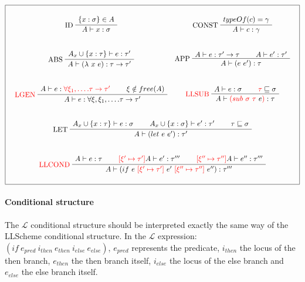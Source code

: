\documentclass[a4paper]{report}
\newcommand{\lang}[0]{\mathcal{L}}
\newcommand{\ax}[1]%
{\AxiomC{$#1$}}
\newcommand{\unc}[1]%
{\UnaryInfC{$#1$}}
\newcommand{\bic}[1]%
{\BinaryInfC{$#1$}}
\newcommand{\tric}[1]%
{\TrinaryInfC{$#1$}}
\newcommand{\drule}%
{\DisplayProof}
\begin{document}
\begin{table}
\centering
$$\boxed{\begin{array}{c}\begin{array}{cc}
\\
\ax{\{x:\sigma\}\in A}
\LeftLabel{ID}
\unc{A\vdash x:\sigma}
\drule
&
\ax{typeOf(c)=\gamma}
\LeftLabel{CONST}
\unc{A\vdash c:\gamma}
\drule
\\\\\\
\ax{A_x\cup\{x:\tau\}\vdash e:\tau'}
\LeftLabel{ABS}
\unc{A\vdash(\lambda\ x\ e):\tau\to\tau'}
\drule
&
\ax{A\vdash e:\tau'\to\tau}
\ax{A\vdash e':\tau'}
\LeftLabel{APP}
\bic{A\vdash (e\ e'):\tau}
\drule
\\\\\\
\ax{A\vdash e:\textcolor{red}{\forall \xi_1,\ldots.\tau\to\tau'}}
\ax{\xi\notin free(A)}
\LeftLabel{\textcolor{red}{LGEN}}
\bic{A\vdash e:\forall\xi,\xi_1,\ldots.\tau\to\tau'}
\drule
&
\ax{A\vdash e:\sigma}
\ax{\textcolor{red}{\tau}\sqsubseteq\sigma}
\LeftLabel{\textcolor{red}{LLSUB}}
\bic{A\vdash \textcolor{red}{(sub\ \sigma\ \tau}\ e\textcolor{red}{)}:\tau}
\drule
\end{array}
\\\\\\
\ax{A_x\cup\{x:\tau\}\vdash e:\sigma}
\ax{A_x\cup\{x:\sigma\}\vdash e':\tau'}
\ax{\tau\sqsubseteq\sigma}
\LeftLabel{LET}
\tric{A\vdash (let\ e\ e'):\tau'}
\drule
\\\\\\
\ax{A\vdash e:\tau}
\ax{\textcolor{red}{\left[\xi'\mapsto\tau'\right]}A\vdash e':\tau'''}
\ax{\textcolor{red}{\left[\xi''\mapsto\tau''\right]}A\vdash e'':\tau'''}
\LeftLabel{\textcolor{red}{LLCOND}}
\tric{A\vdash (if\ e\ \textcolor{red}{\left[\xi'\mapsto\tau'\right]}\ e'\ \textcolor{red}{\left[\xi''\mapsto\tau''\right]}\ e''):\tau'''}
\drule
\\\\
\end{array}
}$$
\caption{The $\lang\lang$ type system. The modifications done on the $\lang$ type system are just meant to handle code annotations.}
\label{ll_ts}
\end{table}

\paragraph{Conditional structure} The $\lang$ conditional structure should be interpreted exactly the same way of the LLScheme conditional structure. In the $\lang$ expression: $(if\ e_{pred}\ i_{then}\ e_{then}\ i_{else}\ e_{else})$, $e_{pred}$ represents the predicate, $i_{then}$ the locus of the then branch, $e_{then}$ the then branch itself, $i_{else}$ the locus of the else branch and $e_{else}$ the else branch itself.
\end{document}

